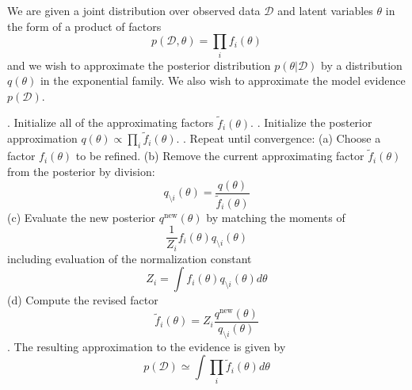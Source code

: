 \documentclass{article}
\begin{document}
\begin{algorithm}
\caption{Expectation propagation}
\begin{algorithmic}
\State We are given a joint distribution over observed data $\mathcal{D}$ and latent variables $\theta$ in the form of a product of factors
\[
p(\mathcal{D}, \theta) = \prod_i f_i(\theta)
\]
\State and we wish to approximate the posterior distribution $p(\theta | \mathcal{D})$ by a distribution $q(\theta)$ in the exponential family. We also wish to approximate the model evidence $p(\mathcal{D})$.

. Initialize all of the approximating factors $\tilde{f}_i(\theta)$.
. Initialize the posterior approximation $q(\theta) \propto \prod_i \tilde{f}_i(\theta)$.
. Repeat until convergence:
\Indent
    \State (a) Choose a factor $f_i(\theta)$ to be refined.
    \State (b) Remove the current approximating factor $\tilde{f}_i(\theta)$ from the posterior by division:
    \[
    q_{\setminus i}(\theta) = \frac{q(\theta)}{\tilde{f}_i(\theta)}
    \]
    \State (c) Evaluate the new posterior $q^{\text{new}}(\theta)$ by matching the moments of 
    \[
    \frac{1}{Z_i} f_i(\theta) q_{\setminus i}(\theta)
    \]
    \State including evaluation of the normalization constant
    \[
    Z_i = \int f_i(\theta) q_{\setminus i}(\theta) d\theta
    \]
    \State (d) Compute the revised factor
    \[
    \tilde{f}_i(\theta) = Z_i \frac{q^{\text{new}}(\theta)}{q_{\setminus i}(\theta)}
    \]
\EndIndent
{}. The resulting approximation to the evidence is given by
\[
p(\mathcal{D}) \simeq \int \prod_i \tilde{f}_i(\theta) d\theta
\]
\end{algorithmic}
\label{algorithm:ep}
\end{algorithm}



\end{document}
